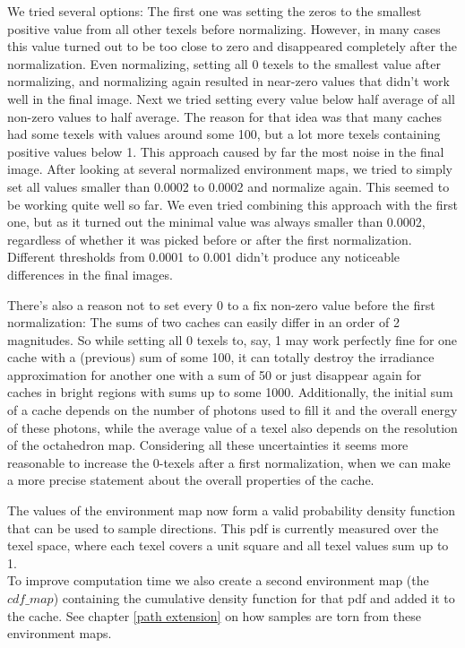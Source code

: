 We tried several options: The first one was setting the zeros to the smallest positive value from all other texels before normalizing. However, in many cases this value turned out to be too close to zero and disappeared completely after the normalization. Even normalizing, setting all 0 texels to the smallest value after normalizing, and normalizing again resulted in near-zero values that didn't work well in the final image.\newline
Next we tried setting every value below half average of all non-zero values to half average. The reason for that idea was that many caches had some texels with values around some 100, but a lot more texels containing positive values below 1. This approach caused by far the most noise in the final image.\newline
After looking at several normalized environment maps, we tried to simply set all values smaller than 0.0002 to 0.0002 and normalize again. This seemed to be working quite well so far. We even tried combining this approach with the first one, but as it turned out the minimal value was always smaller than 0.0002, regardless of whether it was picked before or after the first normalization. Different thresholds from 0.0001 to 0.001 didn't produce any noticeable differences in the final images.

There's also a reason not to set every 0 to a fix non-zero value before the first normalization: The sums of two caches can easily differ in an order of 2 magnitudes. So while setting all 0 texels to, say, 1 may work perfectly fine for one cache with a (previous) sum of some 100, it can totally destroy the irradiance approximation for another one with a sum of 50 or just disappear again for caches in bright regions with sums up to some 1000. Additionally, the initial sum of a cache depends on the number of photons used to fill it and the overall energy of these photons, while the average value of a texel also depends on the resolution of the octahedron map. Considering all these uncertainties it seems more reasonable to increase the 0-texels after a first normalization, when we can make a more precise statement about the overall properties of the cache.

The values of the environment map now form a valid probability density function that can be used to sample directions. This pdf is currently measured over the texel space, where each texel covers a unit square and all texel values sum up to 1.\\
To improve computation time we also create a second environment map (the $cdf\_map$) containing the cumulative density function for that pdf and added it to the cache. See chapter \ref{path extension} on how samples are torn from these environment maps.

